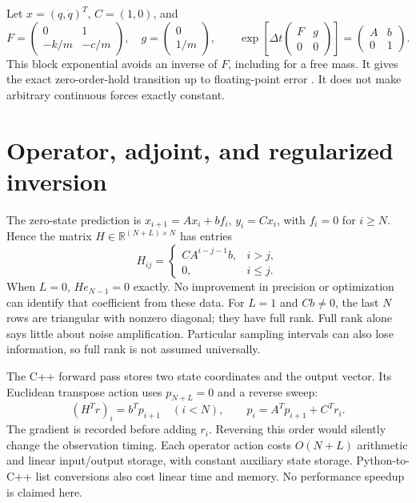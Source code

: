 \documentclass[10pt,a4paper]{article}
\newcommand{\R}{\mathbb{R}}
\begin{document}
Let $x=(q,\dot q)^T$, $C=(1,0)$, and
\begin{equation}
 F=\begin{pmatrix}0&1\\-k/m&-c/m\end{pmatrix},\quad
 g=\begin{pmatrix}0\\1/m\end{pmatrix},\qquad
 \exp\!\left[\Delta t\begin{pmatrix}F&g\\0&0\end{pmatrix}\right]
 =\begin{pmatrix}A&b\\0&1\end{pmatrix}.
 \label{eq:exponential}
\end{equation}
This block exponential avoids an inverse of $F$, including for a free mass.
It gives the exact zero-order-hold transition up to floating-point error
\cite{scipyZOH}. It does not make arbitrary continuous forces exactly constant.

\newpage
\section{Operator, adjoint, and regularized inversion}
The zero-state prediction is $x_{i+1}=Ax_i+b f_i$, $y_i=Cx_i$, with
$f_i=0$ for $i\geq N$. Hence the matrix $H\in\R^{(N+L)\times N}$ has entries
\begin{equation}
 H_{ij}=\begin{cases}CA^{i-j-1}b,&i>j,\\0,&i\leq j.\end{cases}
 \label{eq:H}
\end{equation}
When $L=0$, $He_{N-1}=0$ exactly. No improvement in precision or optimization
can identify that coefficient from these data. For $L=1$ and $Cb\neq0$,
the last $N$ rows are triangular with nonzero diagonal; they have full rank.
Full rank alone says little about noise amplification. Particular sampling
intervals can also lose information, so full rank is not assumed universally.

The C++ forward pass stores two state coordinates and the output vector.
Its Euclidean transpose action uses $p_{N+L}=0$ and a reverse sweep:
\begin{equation}
 (H^Tr)_i=b^Tp_{i+1}\quad(i<N),\qquad
 p_i=A^Tp_{i+1}+C^Tr_i.
 \label{eq:adjoint}
\end{equation}
The gradient is recorded before adding $r_i$. Reversing this order would
silently change the observation timing. Each operator action costs
$O(N+L)$ arithmetic and linear input/output storage, with constant auxiliary
state storage. Python-to-C++ list conversions also cost linear time and
memory. No performance speedup is claimed here.
\end{document}
